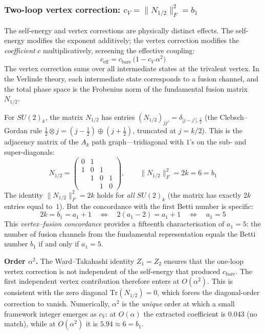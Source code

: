 \documentclass[12pt,a4paper]{article}
\theoremstyle{definition}
\begin{document}
\subsubsection*{Two-loop vertex correction: $c_V = \|N_{1/2}\|_F^2 = b_1$}

The self-energy and vertex corrections are physically distinct effects.  The self-energy modifies the exponent additively; the vertex correction modifies the \emph{coefficient} $c$ multiplicatively, screening the effective coupling:
\begin{equation}
c_{\mathrm{eff}} = c_{\mathrm{bare}} \,\bigl(1 - c_V\,\alpha^2\bigr)
\label{eq:vertex}
\end{equation}
The vertex correction sums over all intermediate states at the trivalent vertex.  In the Verlinde theory, each intermediate state corresponds to a fusion channel, and the total phase space is the Frobenius norm of the fundamental fusion matrix $N_{1/2}$.

For $SU(2)_k$, the matrix $N_{1/2}$ has entries $(N_{1/2})_{jj'} = \delta_{|j-j'|,\frac{1}{2}}$ (the Clebsch--Gordan rule $\tfrac{1}{2} \otimes j = (j{-}\tfrac{1}{2}) \oplus (j{+}\tfrac{1}{2})$, truncated at $j = k/2$).  This is the adjacency matrix of the $A_k$ path graph---tridiagonal with $1$'s on the sub- and super-diagonals:
\begin{equation}
N_{1/2} = \begin{pmatrix} 0 & 1 & & \\ 1 & 0 & 1 & \\ & 1 & 0 & 1 \\ & & 1 & 0 \end{pmatrix}, \qquad
\|N_{1/2}\|_F^2 = 2k = 6 = b_1
\label{eq:frobenius}
\end{equation}
The identity $\|N_{1/2}\|_F^2 = 2k$ holds for \emph{all} $SU(2)_k$ (the matrix has exactly $2k$ entries equal to~$1$).  But the concordance with the first Betti number is specific:
\begin{equation}
2k = b_1 = a_1 + 1 \quad\Longleftrightarrow\quad 2(a_1 - 2) = a_1 + 1 \quad\Longleftrightarrow\quad a_1 = 5
\label{eq:vertex_char}
\end{equation}
This \emph{vertex--fusion concordance} provides a fifteenth characterisation of $a_1 = 5$: the number of fusion channels from the fundamental representation equals the Betti number $b_1$ if and only if $a_1 = 5$.

\textbf{Order $\alpha^2$.}  The Ward--Takahashi identity $Z_1 = Z_2$ ensures that the one-loop vertex correction is not independent of the self-energy that produced $c_{\mathrm{bare}}$.  The first independent vertex contribution therefore enters at $O(\alpha^2)$.  This is consistent with the zero diagonal $\mathrm{Tr}(N_{1/2}) = 0$, which forces the diagonal-order correction to vanish.  Numerically, $\alpha^2$ is the \emph{unique} order at which a small framework integer emerges as $c_V$: at $O(\alpha)$ the extracted coefficient is $0.043$ (no match), while at $O(\alpha^2)$ it is $5.94 \approx 6 = b_1$.
\end{document}
